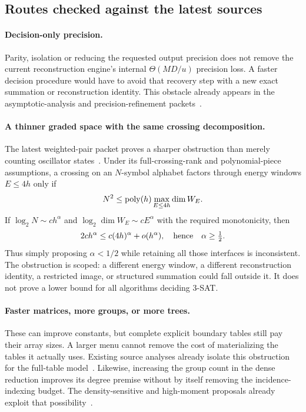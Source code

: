\subsection{Routes checked against the latest sources}

\paragraph{Decision-only precision.}
Parity, isolation or reducing the requested output precision does not
remove the current reconstruction engine's internal
$\Theta(MD/u)$ precision loss. A faster decision procedure would have to
avoid that recovery step with a new exact summation or reconstruction
identity. This obstacle already appears in the asymptotic-analysis and
precision-refinement packets~\cite{barriers,precision}.

\paragraph{A thinner graded space with the same crossing decomposition.}
The latest weighted-pair packet proves a sharper obstruction than merely
counting oscillator states~\cite{pairwise}. Under its full-crossing-rank
and polynomial-piece assumptions, a crossing on an $N$-symbol alphabet
factors through energy windows $E\le4h$ only if
\[
 N^2\le\operatorname{poly}(h)\max_{E\le4h}\dim W_E.
\]
If $\log_2N\sim ch^\alpha$ and
$\log_2\dim W_E\sim cE^\alpha$ with the required monotonicity, then
\[
 2ch^\alpha\le c(4h)^\alpha+o(h^\alpha),
 \quad\hbox{hence}\quad \alpha\ge\tfrac12.
\]
Thus simply proposing $\alpha<1/2$ while retaining all those interfaces
is inconsistent. The obstruction is scoped: a different energy window,
a different reconstruction identity, a restricted image, or structured
summation could fall outside it. It does not prove a lower bound for
all algorithms deciding 3-SAT.

\paragraph{Faster matrices, more groups, or more trees.}
These can improve constants, but complete explicit boundary tables still
pay their array sizes. A larger menu cannot remove the cost of materializing
the tables it actually uses. Existing source analyses already isolate
this obstruction for the full-table model~\cite{tree,pairwise}.
Likewise, increasing the group count in the dense reduction improves its
degree premise without by itself removing the incidence-indexing budget.
The density-sensitive and high-moment proposals already exploit that
possibility~\cite{degree,project}.

